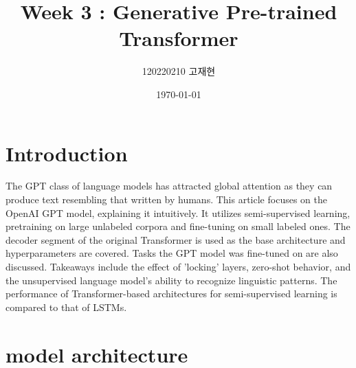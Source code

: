 \documentclass[
	11pt,
	a4paper,
	figtabcapt,
]{oblivoir}
\title{\vspace{-4cm}Week 3 : Generative Pre-trained Transformer}
\author{120220210 고재현}
\date{\today}
\begin{document}


\maketitle




\setcounter{table}{0}		                    %
\setcounter{figure}{0}		                    %



\section{Introduction}
The GPT class of language models has attracted global attention as they can produce text resembling that written by humans. This article focuses on the OpenAI GPT model, explaining it intuitively.
It utilizes semi-supervised learning, pretraining on large unlabeled corpora and fine-tuning on small labeled ones. The decoder segment of the original Transformer is used as the base architecture and hyperparameters are covered.
Tasks the GPT model was fine-tuned on are also discussed. Takeaways include the effect of 'locking' layers, zero-shot behavior, and the unsupervised language model's ability to recognize linguistic patterns.
The performance of Transformer-based\cite{NIPS2017_3f5ee243} architectures for semi-supervised learning is compared to that of LSTMs.

\section{model architecture}\label{sec:architecture}
\end{document}
